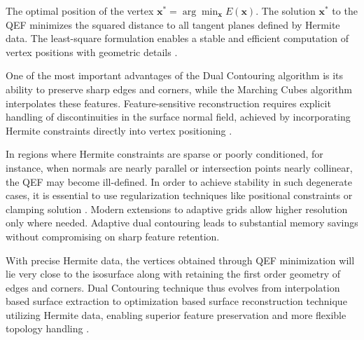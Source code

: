 \documentclass[12pt, a4paper, oneside]{book}
\theoremstyle{plain}
\theoremstyle{definition}
\theoremstyle{remark}
\theoremstyle{definition}
\begin{document}
The optimal position of the vertex $\mathbf{x}^* = \arg\min_{\mathbf{x}} E(\mathbf{x})$. The solution $\mathbf{x}^*$ to the QEF minimizes the squared distance to all tangent planes defined by Hermite data. The least-square formulation enables a stable and efficient computation of vertex positions with geometric details \cite{ju2002dual}.  

One of the most important advantages of the Dual Contouring algorithm is its ability to preserve sharp edges and corners, while the Marching Cubes algorithm interpolates these features. Feature-sensitive reconstruction requires explicit handling of discontinuities in the surface normal field, achieved by incorporating Hermite constraints directly into vertex positioning \cite{kobbelt2001feature}.

In regions where Hermite constraints are sparse or poorly conditioned, for instance, when normals are nearly parallel or intersection points nearly collinear, the QEF may become ill-defined. In order to achieve stability in such degenerate cases, it is essential to use regularization techniques like positional constraints or clamping solution \cite{ju2002dual}.  Modern extensions to adaptive grids allow higher resolution only where needed.  Adaptive dual contouring leads to substantial memory savings without compromising on sharp feature retention.

With precise Hermite data, the vertices obtained through QEF minimization will lie very close to the isosurface along with retaining the first order geometry of edges and corners. Dual Contouring technique thus evolves from interpolation based surface extraction to optimization based surface reconstruction technique utilizing Hermite data, enabling superior feature preservation and more flexible topology handling \cite{ju2002dual,kobbelt2001feature}.
\end{document}
